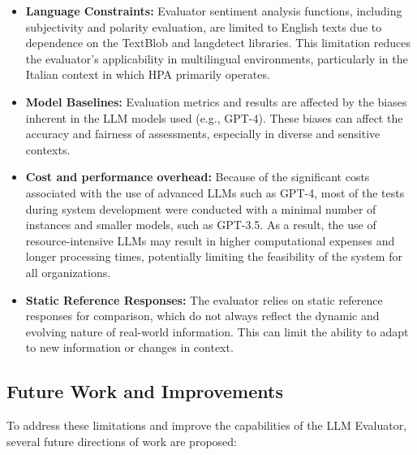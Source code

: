 \begin{itemize}
    \item \textbf{Language Constraints:} Evaluator sentiment analysis functions, including subjectivity and polarity evaluation, are limited to English texts due to dependence on the TextBlob and langdetect libraries. This limitation reduces the evaluator's applicability in multilingual environments, particularly in the Italian context in which HPA primarily operates.
    \item \textbf{Model Baselines:} Evaluation metrics and results are affected by the biases inherent in the LLM models used (e.g., GPT-4). These biases can affect the accuracy and fairness of assessments, especially in diverse and sensitive contexts.
    \item \textbf{Cost and performance overhead:} Because of the significant costs associated with the use of advanced LLMs such as GPT-4, most of the tests during system development were conducted with a minimal number of instances and smaller models, such as GPT-3.5. As a result, the use of resource-intensive LLMs may result in higher computational expenses and longer processing times, potentially limiting the feasibility of the system for all organizations.
    \item \textbf{Static Reference Responses:} The evaluator relies on static reference responses for comparison, which do not always reflect the dynamic and evolving nature of real-world information. This can limit the ability to adapt to new information or changes in context.
\end{itemize}

\subsection{Future Work and Improvements}

To address these limitations and improve the capabilities of the LLM Evaluator, several future directions of work are proposed:

